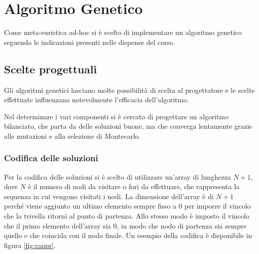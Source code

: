 
\FloatBarrier
\section{Algoritmo Genetico}\label{sec:genetico}

Come meta-euristica ad-hoc si è scelto di implementare un algoritmo genetico seguendo le indicazioni presenti nelle dispense del corso.

\subsection{Scelte progettuali}

Gli algoritmi genetici lasciano molte possibilità di scelta al progettatore e le scelte effettuate influenzano notevolmente l'efficacia dell'algoritmo.

Nel determinare i vari componenti si è cercato di progettare un algoritmo bilanciato, che parta da delle soluzioni buone, ma che converga lentamente grazie alle mutazioni e alla selezione di Montecarlo.

\subsubsection{Codifica delle soluzioni}

Per la codifica delle soluzioni si è scelto di utilizzare un'array di lunghezza $N+1$, dove $N$ è il numero di nodi da visitare o fori da effettuare, che rappresenta la sequenza in cui vengono visitati i nodi. La dimensione dell'array è di $N+1$ perché viene aggiunto un ultimo elemento sempre fisso a $0$ per imporre il vincolo che la trivella ritorni al punto di partenza.
Allo stesso modo è imposto il vincolo che il primo elemento dell'array sia 0, in modo che nodo di partenza sia sempre quello e che coincida con il nodo finale. Un esempio della codifica è disponibile in figura \ref{fig:rappr}.

